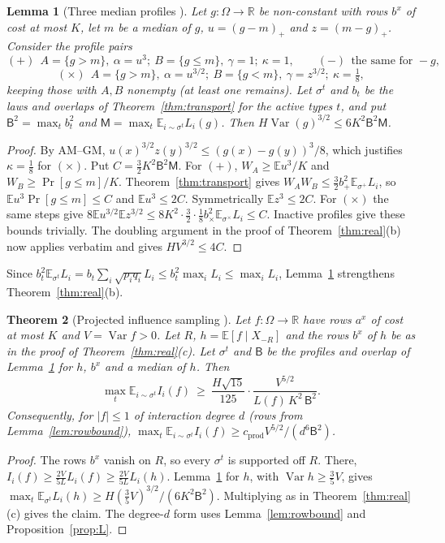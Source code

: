 \documentclass[11pt]{article}
\numberwithin{equation}{section}
\newtheorem{theorem}{Theorem}[section]
\newtheorem{lemma}[theorem]{Lemma}
\theoremstyle{definition}
\theoremstyle{remark}
\newcommand{\E}{\mathbb{E}}
\newcommand{\R}{\mathbb{R}}
\newcommand{\1}{\mathbf 1}
\newcommand{\Var}{\operatorname{Var}}
\newcommand{\cprod}{c_{\mathrm{prod}}}
\begin{document}
\begin{lemma}[Three median profiles {\cite{WriWIL}}]\label{lem:three}
Let $g:\Omega\to\R$ be non-constant with rows $b^x$ of cost at most $K$, let $m$ be a median of $g$, $u=(g-m)_+$ and $z=(m-g)_+$. Consider the profile pairs
\[
(+)\ \ A=\{g>m\},\ \alpha=u^3;\ B=\{g\le m\},\ \gamma=1;\ \kappa=1,\qquad (-)\ \ \text{the same for }-g,
\]
\[
(\times)\ \ A=\{g>m\},\ \alpha=u^{3/2};\ B=\{g<m\},\ \gamma=z^{3/2};\ \kappa=\tfrac18,
\]
keeping those with $A,B$ nonempty (at least one remains). Let $\sigma^t$ and $b_t$ be the laws and overlaps of Theorem~\ref{thm:transport} for the active types $t$, and put $\mathsf B^2=\max_tb_t^2$ and $\mathsf M=\max_t\E_{i\sim\sigma^t}L_i(g)$. Then $H\Var(g)^{3/2}\le6K^2\mathsf B^2\mathsf M$.
\end{lemma}
\begin{proof}
By AM--GM, $u(x)^{3/2}z(y)^{3/2}\le(g(x)-g(y))^3/8$, which justifies $\kappa=\frac18$ for $(\times)$. Put $C=\frac32K^2\mathsf B^2\mathsf M$. For $(+)$, $W_A\ge\E u^3/K$ and $W_B\ge\Pr[g\le m]/K$. Theorem~\ref{thm:transport} gives $W_AW_B\le\frac32b_+^2\E_{\sigma^+}L_i$, so $\E u^3\Pr[g\le m]\le C$ and $\E u^3\le2C$. Symmetrically $\E z^3\le2C$. For $(\times)$ the same steps give $8\E u^{3/2}\E z^{3/2}\le8K^2\cdot\frac32\cdot\frac18b_\times^2\E_{\sigma^\times}L_i\le C$. Inactive profiles give these bounds trivially. The doubling argument in the proof of Theorem~\ref{thm:real}(b) now applies verbatim and gives $HV^{3/2}\le4C$.
\end{proof}

Since $b_t^2\E_{\sigma^t}L_i=b_t\sum_i\sqrt{p_iq_i}L_i\le b_t^2\max_iL_i\le\max_iL_i$, Lemma~\ref{lem:three} strengthens Theorem~\ref{thm:real}(b).

\begin{theorem}[Projected influence sampling {\cite{WriWIL}}]\label{thm:sample}
Let $f:\Omega\to\R$ have rows $a^x$ of cost at most $K$ and $V=\Var f>0$. Let $R$, $h=\E[f\mid X_{-R}]$ and the rows $b^x$ of $h$ be as in the proof of Theorem~\ref{thm:real}(c). Let $\sigma^t$ and $\mathsf B$ be the profiles and overlap of Lemma~\ref{lem:three} for $h$, $b^x$ and a median of $h$. Then
\[
\max_t\E_{i\sim\sigma^t}I_i(f)\ \ge\ \frac{H\sqrt{15}}{125}\cdot\frac{V^{5/2}}{L(f)\,K^2\,\mathsf B^2}.
\]
Consequently, for $|f|\le1$ of interaction degree $d$ (rows from Lemma~\ref{lem:rowbound}), $\max_t\E_{i\sim\sigma^t}I_i(f)\ge\cprod V^{5/2}/(d^6\mathsf B^2)$.
\end{theorem}
\begin{proof}
The rows $b^x$ vanish on $R$, so every $\sigma^t$ is supported off $R$. There, $I_i(f)\ge\frac{2V}{5L}L_i(f)\ge\frac{2V}{5L}L_i(h)$. Lemma~\ref{lem:three} for $h$, with $\Var h\ge\frac35V$, gives $\max_t\E_{\sigma^t}L_i(h)\ge H(\frac35V)^{3/2}/(6K^2\mathsf B^2)$. Multiplying as in Theorem~\ref{thm:real}(c) gives the claim. The degree-$d$ form uses Lemma~\ref{lem:rowbound} and Proposition~\ref{prop:L}.
\end{proof}
\end{document}
